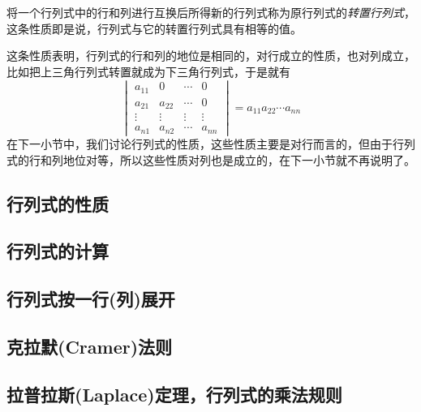 将一个行列式中的行和列进行互换后所得新的行列式称为原行列式的\emph{转置行列式}，这条性质即是说，行列式与它的转置行列式具有相等的值。

这条性质表明，行列式的行和列的地位是相同的，对行成立的性质，也对列成立，比如把上三角行列式转置就成为下三角行列式，于是就有
  \[
  \begin{vmatrix}
    a_{11} & 0 & \cdots & 0 \\
    a_{21} & a_{22} & \cdots & 0 \\
    \vdots & \vdots & \vdots & \vdots \\
    a_{n1} & a_{n2} & \cdots & a_{nn}
  \end{vmatrix}
  = a_{11}a_{22}\cdots a_{nn}
  \]
  在下一小节中，我们讨论行列式的性质，这些性质主要是对行而言的，但由于行列式的行和列地位对等，所以这些性质对列也是成立的，在下一小节就不再说明了。

\subsection{行列式的性质}
\label{sec:properties-of-determinant}

\subsection{行列式的计算}
\label{sec:computition-of-determinant}

\subsection{行列式按一行(列)展开}
\label{sec:determinant-expand-by-row-or-colume}

\subsection{克拉默(Cramer)法则}
\label{sec:cramer-rule}

\subsection{拉普拉斯(Laplace)定理，行列式的乘法规则}
\label{sec:laplace-theorem-of-determinant}





